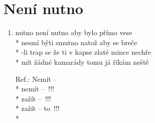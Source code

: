 \section{Není nutno}
\begin{enumerate}
\item {} nutno není nutno aby bylo přímo vese \\*
 nesmí býti smutno natož aby se breče  \\*
-li trap se že ti v kapse zlaté mince nechře \\*
mít žádné kamarády tomu já říkám neště 
\item[Ref.:] Nemít  --  \\*
nemít  -- \,!!! \\*
zažít  -- \,!!! \\*
zažít  --  to \,!!! \\*
\end{enumerate}
